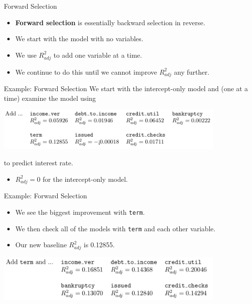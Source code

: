 \begin{frame}{Forward Selection}
    \begin{itemize}
        \item \textbf{Forward selection} is essentially backward selection in reverse.
        \item We start with the model with no variables.
        \item We use $R^2_{adj}$ to add one variable at a time.
        \item We continue to do this until we cannot improve $R^2_{adj}$ any further.
    \end{itemize}
\end{frame}

\begin{frame}{Example: Forward Selection}
    We start with the intercept-only model and (one at a time) examine the model using
    \begin{center}
        \includegraphics[width=4.5in]{images/forw1.png}
    \end{center}
    to predict interest rate.
    \begin{itemize}
        \item $R^2_{adj}=0$ for the intercept-only model.
    \end{itemize}
\end{frame}

\begin{frame}{Example: Forward Selection}
    \begin{itemize}
        \item We see the biggest improvement with \texttt{term}.
        \item We then check all of the models with \texttt{term} and each other variable.
        \item Our new baseline $R^2_{adj}$ is 0.12855.
    \end{itemize}
    \begin{center}
        \includegraphics[width=4.5in]{images/forw2.png}
    \end{center}
\end{frame}

